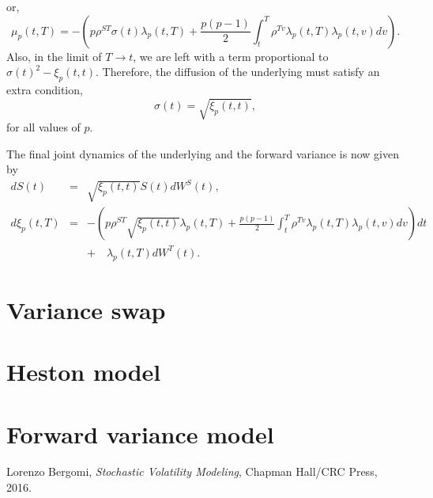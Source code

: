 \documentclass[12pt]{article}
\begin{document}
    or,
    \begin{equation}
      \mu_p(t,T) = -\left(p\rho^{ST}\sigma(t)\lambda_p(t,T) + \frac{p(p-1)}{2} \int_t^T\rho^{Tv}\lambda_p(t,T)\lambda_p(t,v)dv\right).
    \end{equation}
    Also, in the limit of $T\rightarrow t$, we are left with a term proportional to $\sigma(t)^2 - \xi_p(t,t)$. Therefore, the diffusion of
    the underlying must satisfy an extra condition,
    \begin{equation}
      \sigma(t) = \sqrt{\xi_p(t,t)},
    \end{equation}
    for all values of $p$.

    The final joint dynamics of the underlying and the forward variance is now given by
    \begin{eqnarray}
      dS(t) &=& \sqrt{\xi_p(t,t)}S(t)dW^S(t),\\
      d\xi_p(t,T) &=& -\left(p\rho^{ST}\sqrt{\xi_p(t,t)}\lambda_p(t,T) + \frac{p(p-1)}{2} \int_t^T\rho^{Tv}\lambda_p(t,T)\lambda_p(t,v)dv\right)dt \nonumber\\
                  &&  + \quad\lambda_p(t,T)dW^T(t).
    \end{eqnarray}


  \section{Variance swap}




  \section{Heston model}





  \section{Forward variance model}




\begin{thebibliography}{99}
    Lorenzo Bergomi, {\it Stochastic Volatility Modeling}, Chapman Hall/CRC Press, 2016.
\end{thebibliography}
\end{document}
